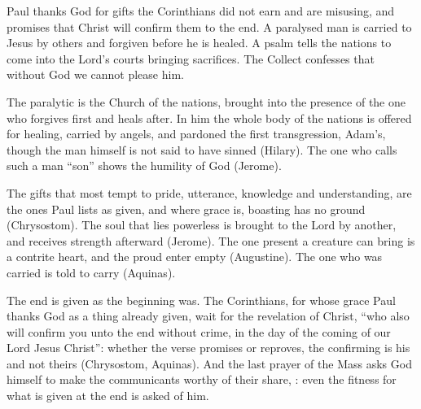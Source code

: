 \begin{fourSenses}
\item[Literal.] Paul thanks God for gifts the Corinthians did not earn and are
misusing, and promises that Christ will confirm them to the end. A paralysed
man is carried to Jesus by others and forgiven before he is healed. A psalm
tells the nations to come into the Lord's courts bringing sacrifices. The
Collect confesses that without God we cannot please him.

\item[Allegorical.] The paralytic is the Church of the nations, brought into
the presence of the one who forgives first and heals after. In him the whole
body of the nations is offered for healing, carried by angels, and pardoned the
first transgression, Adam's, though the man himself is not said to have sinned
(Hilary). The one who calls such a man ``son'' shows the humility of God
(Jerome).

\item[Moral.] The gifts that most tempt to pride, utterance, knowledge and
understanding, are the ones Paul lists as given, and where grace is, boasting
has no ground (Chrysostom). The soul that lies powerless is brought to the Lord
by another, and receives strength afterward (Jerome). The one present a
creature can bring is a contrite heart, and the proud enter empty (Augustine).
The one who was carried is told to carry (Aquinas).

\item[Anagogical.] The end is given as the beginning was. The Corinthians,
for whose grace Paul thanks God as a thing already given, wait for the revelation of Christ, ``who
also will confirm you unto the end without crime, in the day of the coming of
our Lord Jesus Christ'': whether the verse promises or reproves, the confirming
is his and not theirs (Chrysostom, Aquinas). And the last prayer of the Mass asks God
himself to make the communicants worthy of their share, : even the fitness for what is given at the end
is asked of him.
\end{fourSenses}
